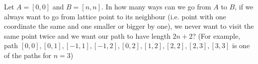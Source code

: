 Let $A=[0,0]$ and $B=[n,n]$. In how many ways can we go from $A$ to $B$, if we always want to go from lattice point to its neighbour (i.e. point with one coordinate the same and one smaller or bigger by one), we never want to visit the same point twice and we want our path to have length $2n+2$?
(For example, path $[0,0],[0,1],[-1,1],[-1,2],[0,2],[1,2],[2,2],[2,3],[3,3]$ is one of the paths for $n=3$)